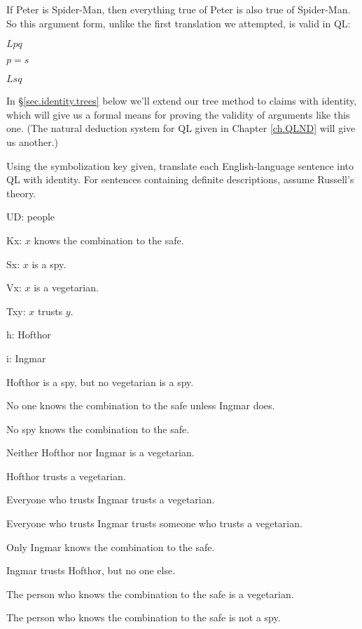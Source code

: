 If Peter is Spider-Man, then everything true of Peter is also true of Spider-Man. So this argument form, unlike the first translation we attempted, is valid in QL:

\begin{earg}
\item[] $Lpq$
\item[] $p{=}s$
\item[\therefore] $Lsq$
\end{earg}

In \S\ref{sec.identity.trees} below we'll extend our tree method to claims with identity, which will give us a formal means for proving the validity of arguments like this one. (The natural deduction system for QL given in Chapter \ref{ch.QLND} will give us another.)





\iffalse

\practiceproblems

\solutions
\problempart
\label{pr.QL-ID-spies}
Using the symbolization key given, translate each English-language sentence into QL with identity. For sentences containing definite descriptions, assume Russell's theory.
\begin{ekey}
\item[UD:] people
\item[Kx:] $x$ knows the combination to the safe.
\item[Sx:] $x$ is a spy.
\item[Vx:] $x$ is a vegetarian.
\item[Txy:] $x$ trusts $y$.
\item[h:] Hofthor
\item[i:] Ingmar
\end{ekey}
\begin{earg}
\item Hofthor is a spy, but no vegetarian is a spy.
\item No one knows the combination to the safe unless Ingmar does.
\item No spy knows the combination to the safe.
\item Neither Hofthor nor Ingmar is a vegetarian.
\item Hofthor trusts a vegetarian.
\item Everyone who trusts Ingmar trusts a vegetarian.
\item Everyone who trusts Ingmar trusts someone who trusts a vegetarian.
\item Only Ingmar knows the combination to the safe.
\item Ingmar trusts Hofthor, but no one else.
\item The person who knows the combination to the safe is a vegetarian.
\item The person who knows the combination to the safe is not a spy.
\end{earg}

